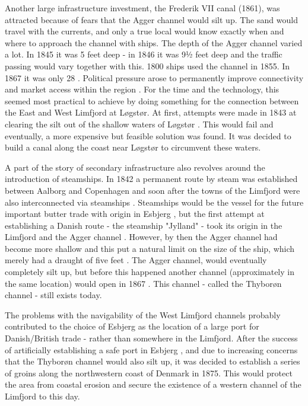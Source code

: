 \documentclass[11pt]{article}
\begin{document}
Another large infrastructure investment, the Frederik VII canal (1861), was attracted because of fears that the Agger channel would silt up. The sand would travel with the currents, and only a true local would know exactly when and where to approach the channel with ships. The depth of the Agger channel varied a lot. In 1845 it was 5 feet deep - in 1846 it was 9½ feet deep \citep{Petersen1877} and the traffic passing would vary together with this. 1800 ships used the channel in 1855. In 1867 it was only 28 \citep{Ravn1993}. Political pressure arose to permanently improve connectivity and market access within the region \citep{petersen1853oplysende}. For the time and the technology, this seemed most practical to achieve by doing something for the connection between the East and West Limfjord at Løgstør. At first, attempts were made in 1843 at clearing the silt out of the shallow waters of Løgstør \citep{Bergsoee1844, p. 311; petersen1853oplysende, p. 4}. This would fail and eventually, a more expensive but feasible solution was found. It was decided to build a canal along the coast near Løgstør to circumvent these waters.

A part of the story of secondary infrastructure also revolves around the introduction of steamships. In 1842 a permanent route by steam was established between Aalborg and Copenhagen and soon after the towns of the Limfjord were also interconnected via steamships \citep{Klem1967}. Steamships would be the vessel for the future important butter trade with origin in Esbjerg \citep{Lampe2015DanesUK}, but the first attempt at establishing a Danish route - the steamship "Jylland" - took its origin in the Limfjord and the Agger channel \citep{Schovelin1891, p. 62}. However, by then the Agger channel had become more shallow and this put a natural limit on the size of the ship, which merely had a draught of five feet \citep{Lassen1883}. The Agger channel, would eventually completely silt up, but before this happened another channel (approximately in the same location) would open in 1867 \citep{Petersen1877}. This channel - called the Thyborøn channel - still exists today.

The problems with the navigability of the West Limfjord channels probably contributed to the choice of Esbjerg as the location of a large port for Danish/British trade - rather than somewhere in the Limfjord. After the success of artificially establishing a safe port in Esbjerg \citep{Lampe2015DanesUK}, and due to increasing concerns that the Thyborøn channel would also silt up, it was decided to establish a series of groins along the northwestern coast of Denmark in 1875. This would protect the area from coastal erosion and secure the existence of a western channel of the Limfjord to this day.
\end{document}
